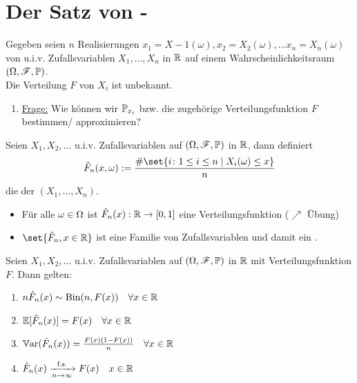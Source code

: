 \section{Der Satz von -}
Gegeben seien $n$ Realisierungen $x_1 = X-1(\omega), x_2 = X_2(\omega), \dots x_n = X_n(\omega)$ von u.i.v. Zufallsvariablen $X_1,\dots, X_n$ in $\R$ auf einem Wahrscheinlichkeitsraum $(\O, \F, \P)$.\\
Die Verteilung $F$ von $X_i$ ist unbekannt.
\begin{enumerate}[label=]
	\item \ul{Frage:} Wie können wir $\P_{x_i}$ bzw. die zugehörige Verteilungsfunktion $F$ bestimmen/ approximieren?
\end{enumerate}
\begin{definition}
	Seien $X_1,X_2, \dots$ u.i.v. Zufallsvariablen auf $(\O,\F,\P)$ in $\R$, dann definiert
	\begin{align*}
		\hat{F}_n(x,\omega) := \frac{\# \set{ i\colon 1 \le i \le n \mid X_i(\omega) \le x}}{n}
	\end{align*}
	die  der  $(X_1, \dots, X_n)$.
\end{definition}
\begin{*remark}
	\begin{itemize}
		\item Für alle $\omega \in \O$ ist $\hat{F}_n(x): \R \to [0,1]$ eine Verteilungsfunktion ($\nearrow$ Übung)
		\item $\set{\hat{F}_n, x \in \R}$ ist eine Familie von Zufallsvariablen und damit ein .
	\end{itemize}
\end{*remark}
\begin{proposition}
	 Seien $X_1, X_2, \dots$ u.i.v. Zufallsvariablen auf $(\O,\F,\P)$ in $\R$ mit Verteilungsfunktion $F$. Dann gelten:
	\begin{enumerate}
		\item $n \hat{F}_n(x) \sim \Bin(n,F(x)) \quad \forall x\in \R$
		\item $\E[\hat{F}_n(x)] = F(x) \quad \forall x \in \R$
		\item $\Var(\hat{F}_n(x)) = \frac{F(x)(1-F(x))}{n} \quad \forall x \in \R$
		\item $\hat{F}_n(x) \xrightarrow[n \to \infty]{\text{f.s.}} F(x) \quad x \in \R$
	\end{enumerate}
\end{proposition}
